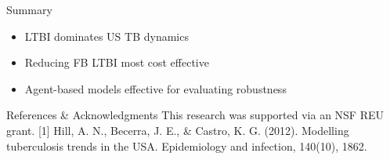\documentclass[final]{beamer}
\begin{document}
\begin{frame}
\begin{columns}[T]
\begin{column}{.3\textwidth}
      \begin{block}{Summary}
        \begin{itemize}
          \item LTBI dominates US TB dynamics
          \item Reducing FB LTBI most cost effective
          \item Agent-based models effective for evaluating robustness
        \end{itemize}
      \end{block}
      \begin{block}{References \& Acknowledgments}
        This research was supported via an NSF REU grant. 
        \small{[1] Hill, A. N., Becerra, J. E., \& Castro, K. G. (2012). Modelling
          tuberculosis trends in the USA. Epidemiology and infection, 140(10),
          1862.}
      \end{block}
      
    \end{column}
  \end{columns}
\end{frame}
\end{document}
